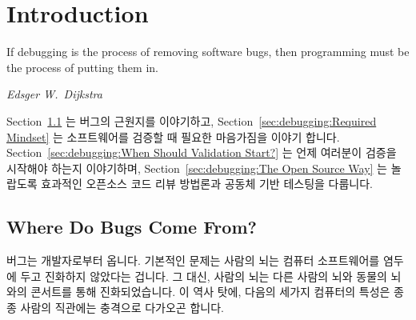 \fi

\section{Introduction}
\label{sec:debugging:Introduction}
%
\epigraph{If debugging is the process of removing software bugs, then
	  programming must be the process of putting them in.}
	 {\emph{Edsger W.~Dijkstra}}

Section~\ref{sec:debugging:Where Do Bugs Come From?}
는 버그의 근원지를 이야기하고,
Section~\ref{sec:debugging:Required Mindset}
는 소프트웨어를 검증할 때 필요한 마음가짐을 이야기 합니다.
Section~\ref{sec:debugging:When Should Validation Start?}
는 언제 여러분이 검증을 시작해야 하는지 이야기하며,
Section~\ref{sec:debugging:The Open Source Way} 는 놀랍도록 효과적인 오픈소스
코드 리뷰 방법론과 공동체 기반 테스팅을 다룹니다.

\subsection{Where Do Bugs Come From?}
\label{sec:debugging:Where Do Bugs Come From?}

버그는 개발자로부터 옵니다.
기본적인 문제는 사람의 뇌는 컴퓨터 소프트웨어를 염두에 두고 진화하지 않았다는
겁니다.
그 대신, 사람의 뇌는 다른 사람의 뇌와 동물의 뇌와의 콘서트를 통해
진화되었습니다.
이 역사 탓에, 다음의 세가지 컴퓨터의 특성은 종종 사람의 직관에는 충격으로
다가오곤 합니다.

